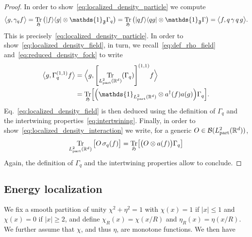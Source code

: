 \documentclass[10pt]{amsart}
\theoremstyle{definition}\newtheorem{defi}[theo]{Definition}\newtheorem{rema}[theo]{Remark}\newtheorem{exam}[theo]{Example}\newtheorem{exem}[theo]{Example}\newtheorem{nota}[theo]{Notation}
\newcommand{\bra}[1]{\left\langle #1\right|}
\newcommand{\ket}[1]{\left|#1\right\rangle}
\DeclareMathOperator{\Tr}{Tr}
\DeclareMathOperator{\partt}{part}
\newcommand{\R}{\mathbb{R}}
\newcommand{\gH}{\mathfrak{H}}
\newcommand{\gF}{\mathfrak{F}}
\newcommand{\cB}{\mathcal{B}}
\newcommand{\1}{\mathds{1}}
\let\oldin\in
\renewcommand{\in}{\mathchoice{\oldin}{\oldin}{\,\oldin\,}{\,\oldin\,}}
\let\originalleft\left
\let\originalright\right
\renewcommand{\left}{\mathopen{}\mathclose\bgroup\originalleft}
\renewcommand{\right}{\aftergroup\egroup\originalright}
\begin{document}
\begin{proof}
In order to show~\eqref{eq:localized_density_particle} we compute
\begin{equation}
\big\langle g,\gamma_q f \big\rangle =\Tr_{ \gH}\big(\ket{f}\bra{g} \otimes \1_{\gF} \Gamma_q\big)=\Tr_{ \gH} \big(\ket{qf} \bra{qg} \otimes \1_{\gF}\Gamma \big)= \big\langle f,q\, \gamma\, q\, g \big\rangle.
\end{equation}
This is precisely~\eqref{eq:localized_density_particle}. In order to show~\eqref{eq:localized_density_field}, in turn, we recall~\eqref{eq:def_rho_field} and~\eqref{eq:reduced_density_fock} to write
\begin{equation}
\begin{split}
\big\langle g, \Gamma^{(1,1)}_qf\big\rangle &= \Big\langle g, \left[\Tr_{L^2_{\partt}(\R^d)}(\Gamma_q)\right]^{(1,1)}f \Big\rangle\\
&= \Tr_{ \gH} \left[\left(\1_{L^2_{\partt}(\R^d)}\otimes a^\dagger(f) a(g)\right) \Gamma_q \right].
\end{split}
\end{equation}
Eq.~\eqref{eq:localized_density_field} is then deduced using the definition of $\Gamma_q$ and the intertwining properties~\eqref{eq:intertwining}. Finally, in order to show~\eqref{eq:localized_density_interaction} we write, for a generic $O\in \cB(L^2_{\partt}(\R^d))$,
\begin{equation*}
\Tr_{L^2_{\partt}(\R^d)}\big[O\, \sigma_{q}(f) \big]=\Tr_{ \gH}\left[\big(O \otimes a(f)\big)\Gamma_q\right]
\end{equation*}
Again, the definition of $\Gamma_q$ and the intertwining properties allow to conclude.
\end{proof}

\subsection{Energy localization}\label{sec:loc}

We fix a smooth partition of unity $\chi^2+\eta^2=1$ with $\chi(x)=1$ if $|x|\le 1$ and $\chi(x)=0$ if $|x|\ge2$, and define $\chi_R(x)=\chi(x/R)$ and $\eta_R(x)=\eta(x/R)$. We further assume that $\chi$, and thus $\eta$, are monotone functions. We then have
\end{document}
